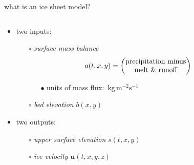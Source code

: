 \documentclass[svgnames,
               hyperref={colorlinks,citecolor=DeepPink4,linkcolor=FireBrick,urlcolor=Maroon},
               usepdftitle=false]  %
               {beamer}
\newcommand{\bu}{\mathbf{u}}
\begin{document}
\begin{frame}{what is an ice sheet model?}

\begin{columns}
\begin{column}{0.6\textwidth}
\begin{itemize}
\begin{definition}
an \alert{ice sheet model} is a \underline{map} which simulates an ice sheet in a climate
\end{definition} 
\item two inputs:
    \begin{itemize}
    \item[$\circ$] \emph{surface mass balance}
$$\hspace{-7mm} a(t,x,y) = \begin{pmatrix}
\text{precipitation minus} \\
\text{melt \& runoff}
\end{pmatrix}$$

\vspace{-3mm}
        \begin{itemize}
        \item[{\scriptsize $\bullet$}] units of mass flux:\, $\text{kg}\, \text{m}^{-2} \text{s}^{-1}$
        \end{itemize}

    \item[$\circ$] \emph{bed elevation} $b(x,y)$
    \end{itemize}
\item two outputs:
    \begin{itemize}
    \item[$\circ$] \emph{upper surface elevation} $s(t,x,y)$
    \item[$\circ$] \emph{ice velocity} $\bu(t,x,y,z)$
    \end{itemize}


\end{itemize}
\end{column}
\end{columns}
\end{frame}
\end{document}
